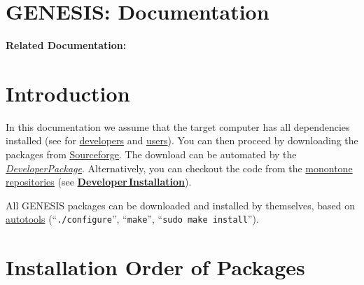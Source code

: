 \documentclass[12pt]{article}
\begin{document}
\section*{GENESIS: Documentation}

{\bf Related Documentation:}

\section*{Introduction}

In this documentation we assume that the target computer has all
dependencies installed (see for
\href{../installation-developer/installation-developer.tex}{developers}
and \href{../installation-debian/installation-debian.tex}{users}). You can
then proceed by downloading the packages from
\href{http://repo-genesis3.cbi.utsa.edu/src/}{Sourceforge}.
The download can be automated by the
\href{../developer-package/developer-package.tex}{\it DeveloperPackage}. Alternatively, you can checkout the code from the
\href{http://monotone.ca/}{monontone}
\href{../developer-intro/developer-intro.tex}{repositories} (see \href{../installation-developer/installation-developer.tex}{\bf Developer\,Installation}).

All GENESIS packages can be downloaded and installed by themselves,
based on \href{http://www.gnu.org/software/autoconf/}{autotools}
(``{\tt ./configure}'', ``{\tt make}'', ``{\tt sudo make install}'').



\section*{Installation Order of Packages}
\end{document}
